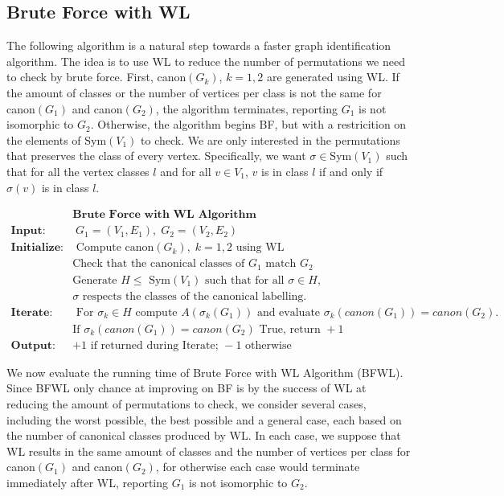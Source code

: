 \subsection{Brute Force with WL}
The following algorithm is a natural step towards a faster graph identification algorithm. The idea is to use WL to reduce the number of permutations we need to check by brute force. First, canon$(G_k)$, $k=1,2$ are generated using WL. If the amount of classes or the number of vertices per class is not the same for canon$(G_1)$ and canon$(G_2)$, the algorithm terminates, reporting $G_1$ is not isomorphic to $G_2$. Otherwise, the algorithm begins BF, but with a restricition on the elements of Sym$(V_1)$ to check. We are only interested in the permutations that preserves the class of every vertex. Specifically, we want $\sigma\in$Sym$(V_1)$ such that for all the vertex classes $l$ and for all $v\in V_1$, $v$ is in class $l$ if and only if $\sigma(v)$ is in class $l$. 
\begin{center}
\begin{align*}
	&\textbf{Brute Force with WL Algorithm}\\
\textbf{Input:}&\;G_1=(V_1,E_1),\;G_2=(V_2,E_2)\\
\textbf{Initialize:}&\text{ Compute canon}(G_k),\;k=1,2\text{ using WL}\\&\text{Check that the canonical classes of }G_1\text{ match }G_2\\&\text{Generate }H\le\text{ Sym}(V_1)\text{ such that for all }\sigma\in H,\\&\sigma\text{ respects the classes of the canonical labelling.}\\
\textbf{Iterate:}&\text{ For }\sigma_k\in H\text{ compute }A(\sigma_k(G_1))\text{ and evaluate }\sigma_k(canon(G_1))=canon(G_2).\\&\text{If }\sigma_k(canon(G_1))=canon(G_2)\text{ True, return }+1\\
\textbf{Output:}&+1\text{ if returned during Iterate; } -1\text{ otherwise}
\end{align*}
\end{center}

We now evaluate the running time of Brute Force with WL Algorithm (BFWL). Since BFWL only chance at improving on BF is by the success of WL at reducing the amount of permutations to check, we consider several cases, including the worst possible, the best possible and a general case, each based on the number of canonical classes produced by WL. In each case, we suppose that WL results in the same amount of classes and the number of vertices per class for canon$(G_1)$ and canon$(G_2)$, for otherwise each case would terminate immediately after WL, reporting $G_1$ is not isomorphic to $G_2$.
